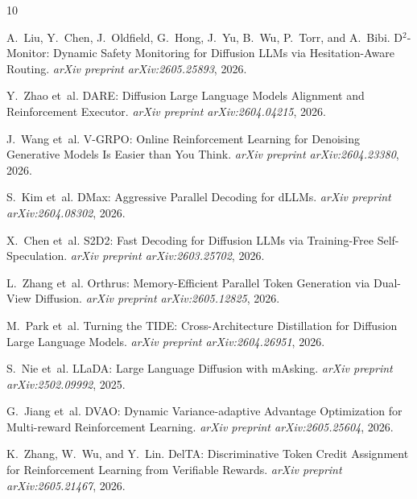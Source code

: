 \documentclass[11pt,a4paper]{article}
\begin{document}

\begin{thebibliography}{10}

A.~Liu, Y.~Chen, J.~Oldfield, G.~Hong, J.~Yu, B.~Wu, P.~Torr, and A.~Bibi.
\newblock D$^2$-Monitor: Dynamic Safety Monitoring for Diffusion LLMs via Hesitation-Aware Routing.
\newblock \emph{arXiv preprint arXiv:2605.25893}, 2026.

Y.~Zhao et~al.
\newblock DARE: Diffusion Large Language Models Alignment and Reinforcement Executor.
\newblock \emph{arXiv preprint arXiv:2604.04215}, 2026.

J.~Wang et~al.
\newblock V-GRPO: Online Reinforcement Learning for Denoising Generative Models Is Easier than You Think.
\newblock \emph{arXiv preprint arXiv:2604.23380}, 2026.

S.~Kim et~al.
\newblock DMax: Aggressive Parallel Decoding for dLLMs.
\newblock \emph{arXiv preprint arXiv:2604.08302}, 2026.

X.~Chen et~al.
\newblock S2D2: Fast Decoding for Diffusion LLMs via Training-Free Self-Speculation.
\newblock \emph{arXiv preprint arXiv:2603.25702}, 2026.

L.~Zhang et~al.
\newblock Orthrus: Memory-Efficient Parallel Token Generation via Dual-View Diffusion.
\newblock \emph{arXiv preprint arXiv:2605.12825}, 2026.

M.~Park et~al.
\newblock Turning the TIDE: Cross-Architecture Distillation for Diffusion Large Language Models.
\newblock \emph{arXiv preprint arXiv:2604.26951}, 2026.

S.~Nie et~al.
\newblock LLaDA: Large Language Diffusion with mAsking.
\newblock \emph{arXiv preprint arXiv:2502.09992}, 2025.

G.~Jiang et~al.
\newblock DVAO: Dynamic Variance-adaptive Advantage Optimization for Multi-reward Reinforcement Learning.
\newblock \emph{arXiv preprint arXiv:2605.25604}, 2026.

K.~Zhang, W.~Wu, and Y.~Lin.
\newblock DelTA: Discriminative Token Credit Assignment for Reinforcement Learning from Verifiable Rewards.
\newblock \emph{arXiv preprint arXiv:2605.21467}, 2026.

\end{thebibliography}
\end{document}
